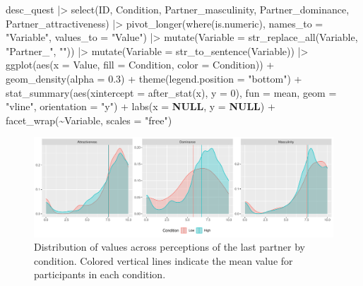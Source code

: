 \documentclass[
  bookmarksnumbered]{article}
\newenvironment{Shaded}{\begin{snugshade}}{\end{snugshade}}
\newcommand{\AttributeTok}[1]{\textcolor[rgb]{0.80,0.80,0.80}{#1}}
\newcommand{\ConstantTok}[1]{\textcolor[rgb]{0.86,0.64,0.64}{\textbf{#1}}}
\newcommand{\DecValTok}[1]{\textcolor[rgb]{0.86,0.86,0.80}{#1}}
\newcommand{\FloatTok}[1]{\textcolor[rgb]{0.75,0.75,0.82}{#1}}
\newcommand{\FunctionTok}[1]{\textcolor[rgb]{0.94,0.94,0.56}{#1}}
\newcommand{\NormalTok}[1]{\textcolor[rgb]{0.80,0.80,0.80}{#1}}
\newcommand{\SpecialCharTok}[1]{\textcolor[rgb]{0.86,0.64,0.64}{#1}}
\newcommand{\StringTok}[1]{\textcolor[rgb]{0.80,0.58,0.58}{#1}}
\begin{document}
\begin{Shaded}
\begin{Highlighting}[]
\NormalTok{desc\_quest }\SpecialCharTok{|\textgreater{}}
  \FunctionTok{select}\NormalTok{(ID, Condition, Partner\_masculinity, Partner\_dominance, }
\NormalTok{         Partner\_attractiveness) }\SpecialCharTok{|\textgreater{}}
  \FunctionTok{pivot\_longer}\NormalTok{(}\FunctionTok{where}\NormalTok{(is.numeric),}
               \AttributeTok{names\_to =} \StringTok{"Variable"}\NormalTok{,}
               \AttributeTok{values\_to =} \StringTok{"Value"}\NormalTok{) }\SpecialCharTok{|\textgreater{}} 
  \FunctionTok{mutate}\NormalTok{(}\AttributeTok{Variable =} \FunctionTok{str\_replace\_all}\NormalTok{(Variable, }\StringTok{"Partner\_"}\NormalTok{, }\StringTok{""}\NormalTok{)) }\SpecialCharTok{|\textgreater{}}
  \FunctionTok{mutate}\NormalTok{(}\AttributeTok{Variable =} \FunctionTok{str\_to\_sentence}\NormalTok{(Variable)) }\SpecialCharTok{|\textgreater{}} 
  \FunctionTok{ggplot}\NormalTok{(}\FunctionTok{aes}\NormalTok{(}\AttributeTok{x =}\NormalTok{ Value, }\AttributeTok{fill =}\NormalTok{ Condition, }\AttributeTok{color =}\NormalTok{ Condition)) }\SpecialCharTok{+}
  \FunctionTok{geom\_density}\NormalTok{(}\AttributeTok{alpha =} \FloatTok{0.3}\NormalTok{) }\SpecialCharTok{+}
  \FunctionTok{theme}\NormalTok{(}\AttributeTok{legend.position =} \StringTok{"bottom"}\NormalTok{) }\SpecialCharTok{+}
  \FunctionTok{stat\_summary}\NormalTok{(}\FunctionTok{aes}\NormalTok{(}\AttributeTok{xintercept =} \FunctionTok{after\_stat}\NormalTok{(x), }\AttributeTok{y =} \DecValTok{0}\NormalTok{),}
               \AttributeTok{fun =}\NormalTok{ mean, }\AttributeTok{geom =} \StringTok{"vline"}\NormalTok{, }\AttributeTok{orientation =} \StringTok{"y"}\NormalTok{) }\SpecialCharTok{+}
  \FunctionTok{labs}\NormalTok{(}\AttributeTok{x =} \ConstantTok{NULL}\NormalTok{, }\AttributeTok{y =} \ConstantTok{NULL}\NormalTok{) }\SpecialCharTok{+}
  \FunctionTok{facet\_wrap}\NormalTok{(}\SpecialCharTok{\textasciitilde{}}\NormalTok{Variable, }\AttributeTok{scales =} \StringTok{"free"}\NormalTok{)}
\end{Highlighting}
\end{Shaded}

\begin{figure}
\centering
\includegraphics{Supplementary_material_files/figure-latex/partner-desc-plot-1.pdf}
\caption{\label{fig:partner-desc-plot}Distribution of values across perceptions of the last partner by condition. Colored vertical lines indicate the mean value for participants in each condition.}
\end{figure}
\end{document}

